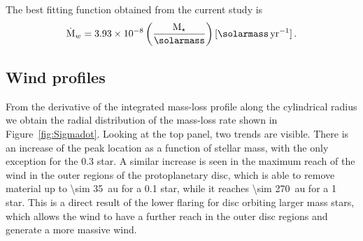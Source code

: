 \documentclass[usenatbib,useAMS,usedcolumn]{mnras}
\begin{document}
The best fitting function obtained from the current study is
\begin{equation}\label{eq:MdotLxMass}
  \dot{\mathrm{M}}_w = 3.93\times10^{-8} \left(\frac{\mathrm{M}_\star}{\si{\solarmass}}\right) [\si{\solarmass.yr^{-1}}]\,.
\end{equation}

\subsection{Wind profiles}\label{sec:wind-prof}
From the derivative of the integrated mass-loss profile along the cylindrical radius we obtain the radial distribution of the mass-loss rate shown in Figure~\ref{fig:Sigmadot}. Looking at the top panel, two trends are visible. There is an increase of the peak location as a function of stellar mass, with the only exception for the \SI{0.3}{\solarmass} star. A similar increase is seen in the maximum reach of the wind in the outer regions of the protoplanetary disc, which is able to remove material up to \SI{\sim 35}{\astronomicalunit} for a \SI{0.1}{\solarmass} star, while it reaches \SI{\sim 270}{\astronomicalunit} for a \SI{1}{\solarmass} star. This is a direct result of the lower flaring for disc orbiting larger mass stars, which allows the wind to have a further reach in the outer disc regions and generate a more massive wind.
\end{document}
